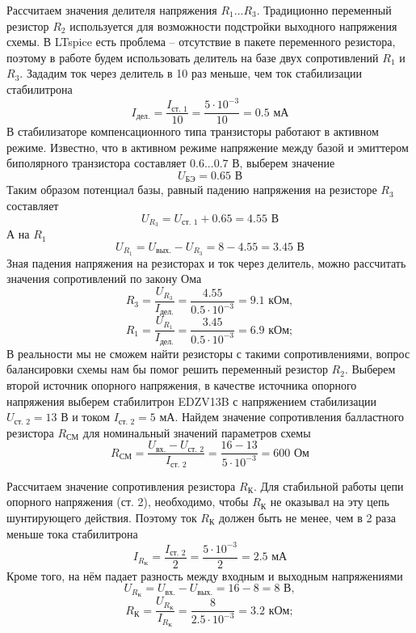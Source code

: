 \documentclass[a4paper, 12pt]{article}
\begin{document}
    Рассчитаем значения делителя напряжения $R_1$...$R_3$.
    Традиционно переменный резистор $R_2$ используется для
    возможности подстройки выходного напряжения схемы.
    В LTspice есть проблема -- отсутствие в пакете переменного
    резистора, поэтому в работе будем использовать делитель на
    базе двух сопротивлений $R_1$ и $R_3$.
    Зададим ток через делитель в 10 раз меньше,
    чем ток стабилизации стабилитрона
    $$
    I_{\text{дел.}}=\dfrac{I_{\text{ст. 1}}}{10}=\dfrac{5\cdot10^{-3}}{10}=0.5 \text{ мА} 
    $$
    В стабилизаторе компенсационного типа транзисторы работают
    в активном режиме. Известно, что в активном режиме напряжение
    между базой и эмиттером биполярного транзистора составляет
    $0.6$...$0.7$ В, выберем значение
    $$
    U_{\text{БЭ}}=0.65 \text{ В}
    $$
    Таким образом потенциал базы,
    равный падению напряжения на
    резисторе $R_3$ составляет
    $$
    U_{R_3}=U_{\text{ст. 1}}+0.65=4.55\text{ В}
    $$
    А на $R_1$
    $$
    U_{R_1}=U_{\text{вых.}}-U_{R_3}=8-4.55=3.45\text{ В}
    $$
    Зная падения напряжения на резисторах и ток через делитель,
    можно рассчитать значения сопротивлений по закону Ома
    $$
    R_3=\dfrac{U_{R_3}}{I_{\text{дел.}}}=\dfrac{4.55}{0.5\cdot10^{-3}}=9.1\text{ кОм},
    $$
    $$
    R_1=\dfrac{U_{R_1}}{I_{\text{дел.}}}=\dfrac{3.45}{0.5\cdot10^{-3}}=6.9\text{ кОм};
    $$
    В реальности мы не сможем найти резисторы
    с такими сопротивлениями, вопрос балансировки
    схемы нам бы помог решить переменный резистор $R_2$.
    Выберем второй источник опорного напряжения,
    в качестве источника опорного напряжения выберем стабилитрон
    EDZV13B с напряжением стабилизации $U_{\text{ст. 2}}=13$ В
    и током $I_{\text{ст. 2}}=5$ мА.
    Найдем значение сопротивления балластного
    резистора $R_{\text{СМ}}$ для номинальный значений параметров схемы
    $$
    R_{\text{СМ}}=\dfrac{U_{\text{вх.}}-U_{\text{ст. 2}}}{I_\text{ст. 2}}=\dfrac{16-13}{5\cdot10^{-3}}=600\text{ Ом}
    $$


    Рассчитаем значение сопротивления резистора $R_\text{К}$.
    Для стабильной работы цепи опорного напряжения (ст. 2),
    необходимо, чтобы $R_\text{К}$ не оказывал на эту цепь шунтирующего действия.
    Поэтому ток $R_\text{К}$ должен быть не менее, чем в 2 раза меньше тока
    стабилитрона
    $$
    I_{R_\text{К}}=\dfrac{I_{\text{ст. 2}}}{2}=\dfrac{5\cdot10^{-3}}{2}=2.5\text{ мА}
    $$
    Кроме того, на нём падает разность между входным
    и выходным напряжениями
    $$
    U_{R_\text{К}}=U_{\text{вх.}}-U_{\text{вых.}}=16-8=8\text{ В},
    $$
    $$
    R_\text{К}=\dfrac{U_{R_\text{К}}}{I_{R_\text{К}}}=\dfrac{8}{2.5\cdot10^{-3}}=3.2\text{ кОм};
    $$
\end{document}
